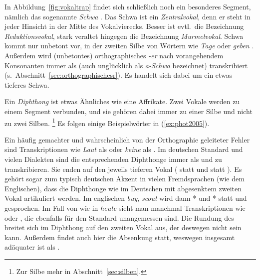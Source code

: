 In Abbildung~\ref{fig:vokaltrap} findet sich schließlich noch ein besonderes Segment, nämlich das sogenannte \textit{Schwa} \textipa{[@]}.
Das Schwa ist ein \textit{Zentralvokal}, denn er steht in jeder Hinsicht in der Mitte des Vokalvierecks.
Besser ist evtl.\ die Bezeichnung \textit{Reduktionsvokal}, stark veraltet hingegen die Bezeichnung \textit{Murmelvokal}.
Schwa kommt nur unbetont vor, \zB in der zweiten Silbe von Wörtern wie \textit{Tage} \textipa{[ta:g@]} oder \textit{geben} \textipa{[ge:b@n]}.
Außerdem wird (unbetontes) orthographisches \textit{-er} nach vorangehendem Konsonanten immer als \textipa{[5]} (auch unglücklich als \textit{a-Schwa} bezeichnet) transkribiert (s.\ Abschnitt~\ref{sec:orthographischesr}).
Es handelt sich dabei um ein etwas tieferes Schwa.

Ein \textit{Diphthong} ist etwas Ähnliches wie eine Affrikate.
Zwei Vokale werden zu einem Segment verbunden, und sie gehören dabei immer zu einer Silbe und nicht zu zwei Silben.%
\footnote{Zur Silbe mehr in Abschnitt~\ref{sec:silben}.}
Es folgen einige Beispielwörter in (\ref{ex:phot2005}).

\begin{exe}
  \ex\label{ex:phot2005}
  \begin{xlist}
  \end{xlist}
\end{exe}

Ein häufig gemachter und wahrscheinlich von der Orthographie geleiteter Fehler sind Transkriptionen wie \textit{Laut} als \Ast\textipa{[l\t{aU}t]} oder \textit{keine} als \Ast\textipa{[k\t{aI}ne]}.
Im deutschen Standard und vielen Dialekten sind die entsprechenden Diphthonge immer als \textipa{[\t{aE}]} und \textipa{[\t{aO}]} zu transkribieren.
Sie enden auf den jeweils tieferen Vokal (\textipa{[O]} statt \textipa{[U]} und \textipa{[E]} statt \textipa{[I]}).
Es gehört sogar zum typisch deutschen Akzent in vielen Fremdsprachen (wie \zB dem Englischen), dass die Diphthonge wie im Deutschen mit abgesenktem zweiten Vokal artikuliert werden.
Im englischen \textit{buy}, \textit{scout} wird dann *\textipa{[b\t{aE}]} und *\textipa{[sk\t{aO}t]} statt \textipa{[b\t{aI}]} und \textipa{[sk\t{aU}t]} gesprochen.
Im Fall von \textipa{[\t{O\oe}]} wie in \textit{heute} \textipa{[h\t{O\oe}t@]} sieht man manchmal Transkriptionen wie \textipa{[\t{OI}]} oder \textipa{[\t{OY}]}, die ebenfalls für den Standard unangemessen sind.
Die Rundung des \textipa{[O]} breitet sich im Diphthong auf den zweiten Vokal aus, der deswegen nicht \textipa{[I]} sein kann.
Außerdem findet auch hier die Absenkung statt, weswegen insgesamt \textipa{[\t{O\oe}]} adäquater ist als \textipa{[\t{OY}]}.

